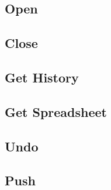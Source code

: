 \subsection{Open}
\label{sec:message:open}


\subsection{Close}
\label{sec:message:close}


\subsection{Get History}
\label{sec:message:get_history}


\subsection{Get Spreadsheet}
\label{sec:message:get_spreadsheet}


\subsection{Undo}
\label{sec:message:undo}


\subsection{Push}
\label{sec:message:push}

